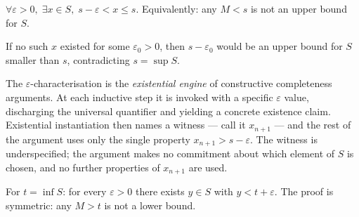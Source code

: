 \begin{remark*}
\end{remark*}


\begin{remark}
$\forall\varepsilon>0,\;\exists x\in S,\;s-\varepsilon<x\leq s$.
Equivalently: any $M<s$ is not an upper bound for $S$.
\end{remark}

\begin{remark}
If no such $x$ existed for some $\varepsilon_0>0$, then $s-\varepsilon_0$
would be an upper bound for $S$ smaller than $s$, contradicting $s=\sup S$.
\end{remark}

\begin{remark}
The $\varepsilon$-characterisation is the \emph{existential engine} of
constructive completeness arguments. At each inductive step it is invoked
with a specific $\varepsilon$ value, discharging the universal quantifier
and yielding a concrete existence claim. Existential instantiation then
names a witness --- call it $x_{n+1}$ --- and the rest of the argument uses
only the single property $x_{n+1}>s-\varepsilon$. The witness is
underspecified; the argument makes no commitment about which element of $S$
is chosen, and no further properties of $x_{n+1}$ are used.
\end{remark}

\begin{remark}
For $t=\inf S$: for every $\varepsilon>0$ there exists $y\in S$ with
$y<t+\varepsilon$. The proof is symmetric: any $M>t$ is not a lower bound.
\end{remark}

